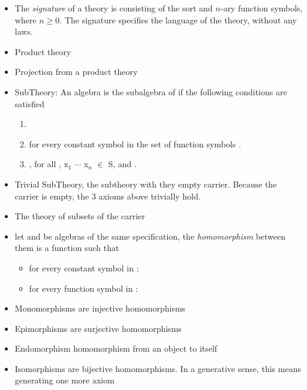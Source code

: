 \begin{itemize}
    \item The \emph{signature} of a theory   is  consisting of the sort and $n$-ary function symbols, where $n \geq 0$. The signature specifies the language of the theory, without any laws. 
    \item Product theory 
    \item Projection from a product theory 
    \item SubTheory: An algebra  is the subalgebra of  if the following conditions are satisfied %
    \begin{enumerate}
    \item {} \lstmath{$\subseteq$} 
    \item {} \lstmath{=}  for every constant symbol in the set of function symbols . 
    \item {} \lstmath{=} , for all , {x$_1$ $\cdots$ x$_n$ $\in$ S}, and . 
    \end{enumerate}
    \item Trivial SubTheory, the subtheory with they empty carrier. Because the carrier is empty, the $3$ axioms above trivially hold. 
    \item The theory of subsets of the carrier 
    \item let  and  be algebras of the same specification, the \emph{homomorphism} between them is a function  such that 
    \begin{itemize}
        \item for every constant symbol in :  
        \item for every function symbol in : 
    \end{itemize}
    \item Monomorphisms are injective homomorphisms 
    \item Epimorphisms are surjective homomorphisms 
    \item Endomorphism homomorphism from an object to itself 
    \item Isomorphisms are bijective homomorphisms. In a generative sense, this means generating one more axiom 

\end{itemize}

